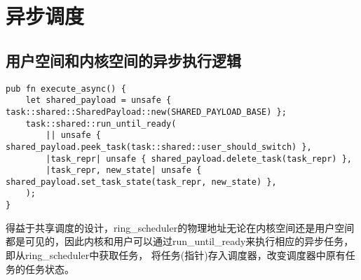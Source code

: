 \section{异步调度}

\subsection{用户空间和内核空间的异步执行逻辑}

\begin{lstlisting}[caption=用户空间的异步逻辑]
pub fn execute_async() {
    let shared_payload = unsafe { task::shared::SharedPayload::new(SHARED_PAYLOAD_BASE) };
    task::shared::run_until_ready(
        || unsafe { shared_payload.peek_task(task::shared::user_should_switch) },
        |task_repr| unsafe { shared_payload.delete_task(task_repr) },
        |task_repr, new_state| unsafe { shared_payload.set_task_state(task_repr, new_state) },
    );
}
\end{lstlisting}

得益于共享调度的设计，ring\_scheduler的物理地址无论在内核空间还是用户空间都是可见的，因此内核和用户可以通过run\_until\_ready来执行相应的异步任务， 即从ring\_scheduler中获取任务， 将任务(指针)存入调度器，改变调度器中原有任务的任务状态。


